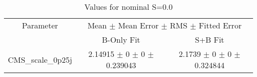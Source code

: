 \begin{table}
\centering
\caption{Values for nominal S=0.0}
\begin{tabular}{ccc}
\toprule
Parameter & \multicolumn{2}{c}{Mean $\pm$ Mean Error $\pm$ RMS $\pm$ Fitted Error}\\
 & B-Only Fit & S+B Fit\\
\midrule
CMS\_scale\_0p25j & \num{2.14915} $\pm$ \num{0} $\pm$ \num{0} $\pm$ \num{0.239043} & \num{2.1739} $\pm$ \num{0} $\pm$ \num{0} $\pm$ \num{0.324844}\\
\bottomrule
\end{tabular}
\end{table}